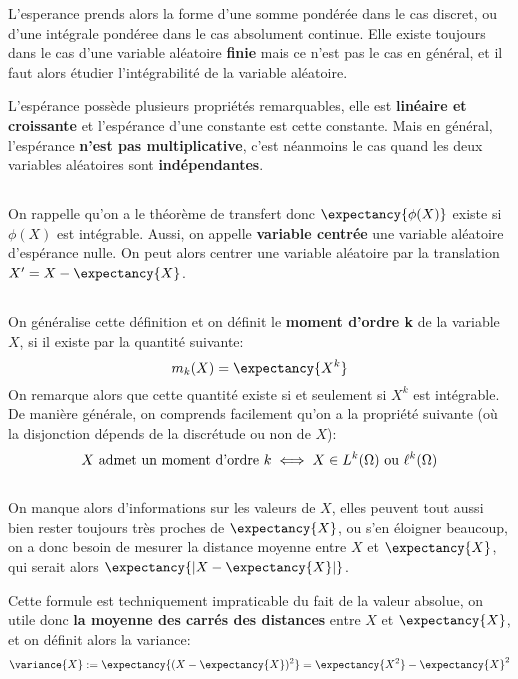 L'esperance prends alors la forme d'une somme pondérée dans le cas discret, ou d'une intégrale pondéree dans le cas absolument continue. Elle existe toujours dans le cas d'une variable aléatoire \textbf{finie} mais ce n'est pas le cas en général, et il faut alors étudier l'intégrabilité de la variable aléatoire. \<

L'espérance possède plusieurs propriétés remarquables, elle est \textbf{linéaire et croissante} et l'espérance d'une constante est cette constante.\+
Mais en général, l'espérance \textbf{n'est pas multiplicative}, c'est néanmoins le cas quand les deux variables aléatoires sont \textbf{indépendantes}.
\subsection*{}
On rappelle qu'on a le théorème de transfert donc \(\expectancy{\phi(X)}\) existe si \( \phi(X) \) est intégrable. Aussi, on appelle \textbf{variable centrée} une variable aléatoire d'espérance nulle. On peut alors centrer une variable aléatoire par la translation \(X' = X - \expectancy{X}\).
\subsection*{}
On généralise cette définition et on définit le \textbf{moment d'ordre k} de la variable \( X \), si il existe par la quantité suivante:
\[ 
   m_k(X) = \expectancy{X^k} 
\]
On remarque alors que cette quantité existe si et seulement si \( X^k \) est intégrable. De manière générale, on comprends facilement qu'on a la propriété suivante (où la disjonction dépends de la discrétude ou non de \( X \)):
\[ 
   X \text{ admet un moment d'ordre \( k \)} \iff X \in L^k( \Omega) \text{ ou } \ell^k( \Omega)
\]
\subsection*{}
On manque alors d'informations sur les valeurs de \(X\), elles peuvent tout aussi bien rester toujours très
proches de \(\expectancy{X}\), ou s'en éloigner beaucoup, on a donc besoin de mesurer la distance moyenne entre \(X\) et \(\expectancy{X}\), qui serait alors \(\expectancy{| X - \expectancy{X} |}\).\pagebreak

Cette formule est techniquement impraticable du fait de la valeur absolue, on utile donc \textbf{la moyenne des carrés des distances} entre \(X\) et \(\expectancy{X}\), et on définit alors la variance:
\[ 
   \variance{X} := \expectancy{(X - \expectancy{X})^2} = \expectancy{X^2} - \expectancy{X}^2
\]


